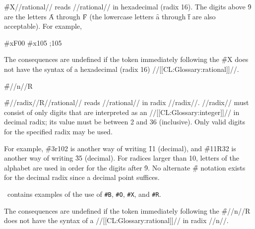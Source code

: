 \f{\#X}//rational// reads //rational// in hexadecimal (radix 16).
The digits above \f{9} are the letters \f{A} through \f{F} (the lowercase
letters \f{a} through \f{f} are also acceptable).  For example,

\code
 #xF00              
 #x105  ;105\ssss
\endcode

The consequences are undefined if the token immediately following
the \f{\#X} does not have the syntax of a hexadecimal (\ie radix 16) //[[CL:Glossary:rational]]//.


\endsubsubsection%



\f{\#//n//R}
                                                             
\f{\#//radix//R//rational//} reads //rational// in radix //radix//.
//radix// must consist of only digits
that are interpreted as an //[[CL:Glossary:integer]]//
in decimal radix; its value must be between 2 and 36 (inclusive).
Only valid digits
for the specified radix may be used.


For example, \f{\#3r102} is another way of writing \f{11} (decimal), 
and \f{\#11R32}
is another way of writing \f{35} (decimal).  
For radices larger than 10, letters of
the alphabet are used in order for the digits after \f{9}.
No alternate \f{\#} notation exists for the decimal radix since a
decimal point suffices.

\Thenextfigure\ contains examples of the use of {\tt\#B},
{\tt \#O}, {\tt \#X}, and {\tt \#R}.


The consequences are undefined if the token immediately following
the \f{\#//n//R} does not have the syntax of a //[[CL:Glossary:rational]]// in radix //n//.


